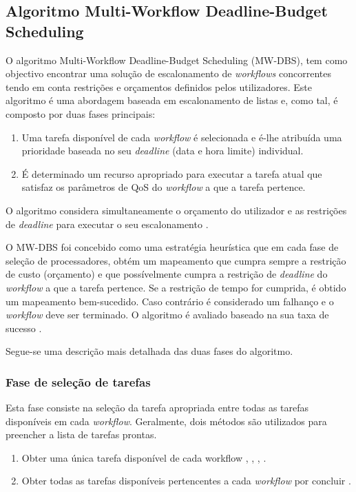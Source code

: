 \subsection{Algoritmo Multi-Workflow Deadline-Budget Scheduling}
O algoritmo Multi-Workflow Deadline-Budget Scheduling (MW-DBS), tem como objectivo encontrar uma solução de escalonamento de \textit{workflows} concorrentes tendo em conta restrições e orçamentos definidos pelos utilizadores. Este algoritmo é uma abordagem baseada em escalonamento de listas e, como tal, é composto por duas fases principais:
\begin{enumerate}
	\item Uma tarefa disponível de cada \textit{workflow} é selecionada e é-lhe atribuída uma prioridade baseada no seu \textit{deadline} (data e hora limite) individual.
	\item É determinado um recurso apropriado para executar a tarefa atual que satisfaz os parâmetros de QoS do \textit{workflow} a que a tarefa pertence.
\end{enumerate}
O algoritmo considera simultaneamente o orçamento do utilizador e as restrições de \textit{deadline} para executar o seu escalonamento \cite{ArabnejadUP}.

O MW-DBS foi concebido como uma estratégia heurística que em cada fase de seleção de processadores, obtém um mapeamento que cumpra sempre a restrição de custo (orçamento) e que possívelmente cumpra a restrição de \textit{deadline} do \textit{workflow} a que a tarefa pertence. Se a restrição de tempo for cumprida, é obtido um mapeamento bem-sucedido. Caso contrário  é considerado um falhanço e o \textit{workflow} deve ser terminado. O algoritmo é avaliado baseado na sua taxa de sucesso \cite{ArabnejadUP}.

Segue-se uma descrição mais detalhada das duas fases do algoritmo.

\subsubsection{Fase de seleção de tarefas}
Esta fase consiste na seleção da tarefa apropriada entre todas as tarefas disponíveis em cada \textit{workflow}. Geralmente, dois métodos são utilizados para preencher a lista de tarefas prontas.
\begin{enumerate}
	\item Obter uma única tarefa disponível de cada workflow \cite{Arabnejad2012}, \cite{Arabnejad2014}, \cite{Arabnejad2014a}, \cite{Hsu2011}.
	\item Obter todas as tarefas disponíveis pertencentes a cada \textit{workflow} por concluir \cite{Yu2008}.
\end{enumerate} 

